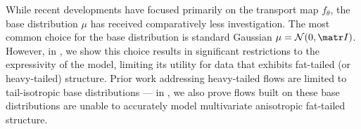 \documentclass[twoside]{article}
\theoremstyle{definition}
\theoremstyle{remark}
\begin{document}
While recent developments \citep{chen2019residual,huang2018neural,durkan2019neural} have focused primarily
on the transport map $f_\theta$, the base distribution $\mu$ has received comparatively less investigation. 
The most common choice for the base distribution is standard Gaussian $\mu = \cN(0,\mI)$.
However, in , we show this choice results in significant
restrictions to the expressivity of the model, limiting its utility for data that
exhibits fat-tailed (or heavy-tailed) structure.
Prior work addressing heavy-tailed flows \citep{jaini2020tails}
are limited to tail-isotropic base distributions ---
in , we also prove flows built on these base distributions
are unable to accurately model multivariate anisotropic fat-tailed structure.
\end{document}
